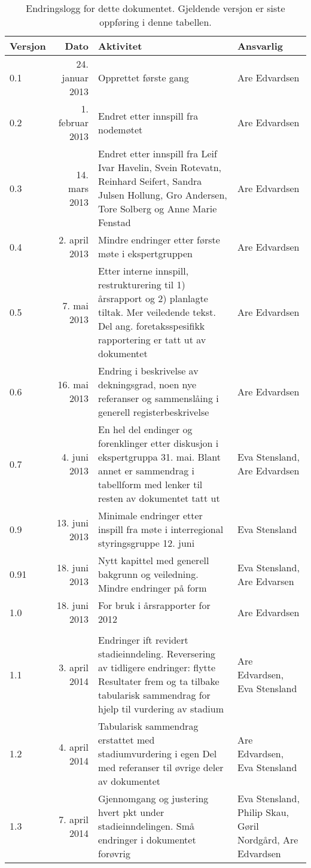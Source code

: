 \documentclass[norsk, a4paper, twocolumn]{report}
\begin{document}
\begin{table}[ht]
  \centering
  \begin{tabular}{lrp{8cm}p{2.5cm}}
    \hline
    Versjon & Dato & Aktivitet & Ansvarlig \\
    \hline
    0.1 & 24. januar 2013 & Opprettet første gang & Are Edvardsen \\
    0.2 & 1. februar 2013 & Endret etter innspill fra nodemøtet &
    Are Edvardsen \\
    0.3 & 14. mars 2013 & Endret etter innspill fra Leif Ivar Havelin,
    Svein Rotevatn,
    Reinhard Seifert, Sandra Julsen Hollung, Gro Andersen, Tore Solberg og
    Anne Marie Fenstad & Are Edvardsen \\
    0.4 & 2. april 2013 & Mindre endringer etter første møte i ekspertgruppen &
    Are Edvardsen \\
    0.5 & 7. mai 2013 & Etter interne innspill, restrukturering til 1)
    årsrapport og 2) planlagte tiltak. Mer veiledende tekst. Del ang.
    foretaksspesifikk rapportering er tatt ut av dokumentet & Are Edvardsen \\
    0.6 & 16. mai 2013 & Endring i beskrivelse av
    dekningsgrad, noen nye referanser og sammenslåing i generell
    registerbeskrivelse & Are Edvardsen \\
    0.7 & 4. juni 2013 & En hel del endinger og forenklinger etter diskusjon i
    ekspertgruppa 31. mai. Blant annet er sammendrag i tabellform med lenker
    til resten av dokumentet tatt ut & Eva Stensland, Are Edvardsen \\
    0.9 & 13. juni 2013 & Minimale endringer etter inspill fra møte i
    interregional styringsgruppe 12. juni & Eva Stensland \\
    0.91 & 18. juni 2013 & Nytt kapittel med generell bakgrunn og veiledning.
    Mindre endringer på form & Eva Stensland, Are Edvarsen \\
    1.0 & 18. juni 2013 & For bruk i årsrapporter for 2012 & Are Edvardsen \\
     & & & \\
    1.1 & 3. april 2014 & Endringer ift revidert stadieinndeling. Reversering
    av tidligere endringer: flytte Resultater frem og ta tilbake
    tabularisk sammendrag for hjelp til vurdering av stadium & Are Edvardsen,
    Eva Stensland \\
    1.2 & 4. april 2014 & Tabularisk sammendrag erstattet med stadiumvurdering
    i egen Del med referanser til øvrige deler av dokumentet & Are Edvardsen,
    Eva Stensland \\
    1.3 & 7. april 2014 & Gjennomgang og justering hvert pkt under
    stadieinndelingen. Små endringer i dokumentet forøvrig &
    Eva Stensland, Philip Skau, Gøril Nordgård, Are Edvardsen \\
    \hline
  \end{tabular}
  \caption{Endringslogg for dette dokumentet. Gjeldende versjon er siste
  oppføring i denne tabellen.}
  \label{tab:log}
\end{table}
\end{document}
